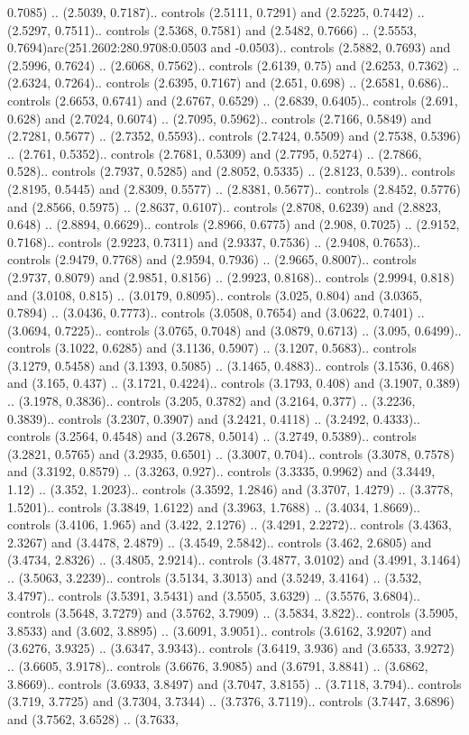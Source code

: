 0.7085) .. (2.5039, 0.7187).. controls (2.5111, 0.7291) and (2.5225, 0.7442) .. (2.5297, 0.7511).. controls (2.5368, 0.7581) and (2.5482, 0.7666) .. (2.5553, 0.7694)arc(251.2602:280.9708:0.0503 and -0.0503).. controls (2.5882, 0.7693) and (2.5996, 0.7624) .. (2.6068, 0.7562).. controls (2.6139, 0.75) and (2.6253, 0.7362) .. (2.6324, 0.7264).. controls (2.6395, 0.7167) and (2.651, 0.698) .. (2.6581, 0.686).. controls (2.6653, 0.6741) and (2.6767, 0.6529) .. (2.6839, 0.6405).. controls (2.691, 0.628) and (2.7024, 0.6074) .. (2.7095, 0.5962).. controls (2.7166, 0.5849) and (2.7281, 0.5677) .. (2.7352, 0.5593).. controls (2.7424, 0.5509) and (2.7538, 0.5396) .. (2.761, 0.5352).. controls (2.7681, 0.5309) and (2.7795, 0.5274) .. (2.7866, 0.528).. controls (2.7937, 0.5285) and (2.8052, 0.5335) .. (2.8123, 0.539).. controls (2.8195, 0.5445) and (2.8309, 0.5577) .. (2.8381, 0.5677).. controls (2.8452, 0.5776) and (2.8566, 0.5975) .. (2.8637, 0.6107).. controls (2.8708, 0.6239) and (2.8823, 0.648) .. (2.8894, 0.6629).. controls (2.8966, 0.6775) and (2.908, 0.7025) .. (2.9152, 0.7168).. controls (2.9223, 0.7311) and (2.9337, 0.7536) .. (2.9408, 0.7653).. controls (2.9479, 0.7768) and (2.9594, 0.7936) .. (2.9665, 0.8007).. controls (2.9737, 0.8079) and (2.9851, 0.8156) .. (2.9923, 0.8168).. controls (2.9994, 0.818) and (3.0108, 0.815) .. (3.0179, 0.8095).. controls (3.025, 0.804) and (3.0365, 0.7894) .. (3.0436, 0.7773).. controls (3.0508, 0.7654) and (3.0622, 0.7401) .. (3.0694, 0.7225).. controls (3.0765, 0.7048) and (3.0879, 0.6713) .. (3.095, 0.6499).. controls (3.1022, 0.6285) and (3.1136, 0.5907) .. (3.1207, 0.5683).. controls (3.1279, 0.5458) and (3.1393, 0.5085) .. (3.1465, 0.4883).. controls (3.1536, 0.468) and (3.165, 0.437) .. (3.1721, 0.4224).. controls (3.1793, 0.408) and (3.1907, 0.389) .. (3.1978, 0.3836).. controls (3.205, 0.3782) and (3.2164, 0.377) .. (3.2236, 0.3839).. controls (3.2307, 0.3907) and (3.2421, 0.4118) .. (3.2492, 0.4333).. controls (3.2564, 0.4548) and (3.2678, 0.5014) .. (3.2749, 0.5389).. controls (3.2821, 0.5765) and (3.2935, 0.6501) .. (3.3007, 0.704).. controls (3.3078, 0.7578) and (3.3192, 0.8579) .. (3.3263, 0.927).. controls (3.3335, 0.9962) and (3.3449, 1.12) .. (3.352, 1.2023).. controls (3.3592, 1.2846) and (3.3707, 1.4279) .. (3.3778, 1.5201).. controls (3.3849, 1.6122) and (3.3963, 1.7688) .. (3.4034, 1.8669).. controls (3.4106, 1.965) and (3.422, 2.1276) .. (3.4291, 2.2272).. controls (3.4363, 2.3267) and (3.4478, 2.4879) .. (3.4549, 2.5842).. controls (3.462, 2.6805) and (3.4734, 2.8326) .. (3.4805, 2.9214).. controls (3.4877, 3.0102) and (3.4991, 3.1464) .. (3.5063, 3.2239).. controls (3.5134, 3.3013) and (3.5249, 3.4164) .. (3.532, 3.4797).. controls (3.5391, 3.5431) and (3.5505, 3.6329) .. (3.5576, 3.6804).. controls (3.5648, 3.7279) and (3.5762, 3.7909) .. (3.5834, 3.822).. controls (3.5905, 3.8533) and (3.602, 3.8895) .. (3.6091, 3.9051).. controls (3.6162, 3.9207) and (3.6276, 3.9325) .. (3.6347, 3.9343).. controls (3.6419, 3.936) and (3.6533, 3.9272) .. (3.6605, 3.9178).. controls (3.6676, 3.9085) and (3.6791, 3.8841) .. (3.6862, 3.8669).. controls (3.6933, 3.8497) and (3.7047, 3.8155) .. (3.7118, 3.794).. controls (3.719, 3.7725) and (3.7304, 3.7344) .. (3.7376, 3.7119).. controls (3.7447, 3.6896) and (3.7562, 3.6528) .. (3.7633, 